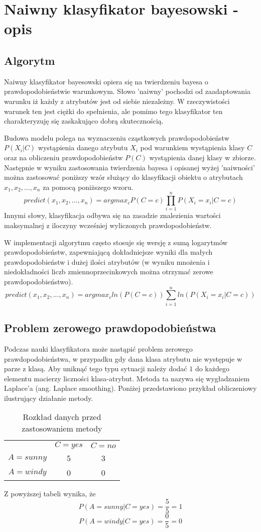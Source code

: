 \chapter{Naiwny klasyfikator bayesowski - opis}
	\section{Algorytm} \label{algo}
Naiwny klasyfikator bayesowski opiera się na twierdzeniu bayesa o prawdopodobieństwie warunkowym. Słowo 'naiwny' pochodzi od zaadaptowania warunku iż każdy z atrybutów jest od siebie niezależny. W rzeczywistości warunek ten jest ciężki do spełnienia, ale pomimo tego klasyfikator ten charakteryzuję się zaskakująco dobrą skutecznością.

Budowa modelu polega na wyznaczeniu cząstkowych prawdopodobieństw $P(X_i|C)$ wystąpienia danego atrybutu $X_i$ pod warunkiem wystąpienia klasy $C$ oraz na obliczeniu prawdopodobieństw $P(C)$ wystąpienia danej klasy w zbiorze. Następnie w wyniku zastosowania twierdzenia bayesa i opisanej wyżej 'naiwności' można zastosować poniższy wzór służący do klasyfikacji obiektu o atrybutach $x_1, x_2,..., x_n$ za pomocą poniższego wzoru.
$$ predict(x_1, x_2,..., x_n) = argmax_cP(C=c)\prod_{i=1}^{n}P(X_i = x_i | C = c)$$
Innymi słowy, klasyfikacja odbywa się na zasadzie znalezienia wartości maksymalnej z iloczyny wcześniej wyliczonych prawdopodobieństw. 

W implementacji algorytmu często stosuje się wersję z sumą logarytmów prawdopodobieństw, zapewniającą dokładniejsze wyniki dla małych prawdopodobieństw i dużej ilości atrybutów (w wyniku mnożenia i niedokładności liczb zmiennoprzecinkowych można otrzymać zerowe prawdopodobieństwo). 
$$ predict(x_1, x_2,..., x_n) = argmax_c ln( P(C=c) )\sum_{i=1}^{n}ln( P(X_i = x_i | C = c) )$$
	\section{Problem zerowego prawdopodobieństwa}
Podczas nauki klasyfikatora może nastąpić problem zerowego prawdopodobieństwa, w przypadku gdy dana klasa atrybutu nie występuje w parze z klasą. Aby uniknąć tego typu sytuacji należy dodać $1$ do każdego elementu macierzy liczności klasa-atrybut. Metoda ta nazywa się wygładzaniem Laplace'a (ang. Laplace smoothing). Poniżej przedstawiono przykład obliczeniowy ilustrujący działanie metody.

\begin{table}[H]
\centering
\caption{Rozkład danych przed zastosowaniem metody}
\begin{tabular}{ ccc }
 & $C = yes$ & $C = no$ \\
$A = sunny$ & 5 & 3 \\
$A = windy$ & 0 & 0 \\
\end{tabular}
\end{table}
Z powyższej tabeli wynika, że
$$P(A = sunny | C = yes) = \frac{5}{5} = 1$$
$$P(A = windy | C = yes) = \frac{0}{5} = 0$$

